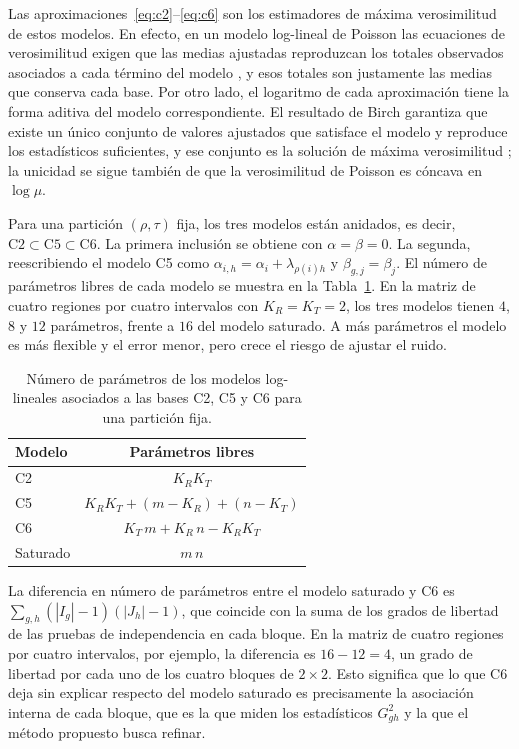 Las aproximaciones~\eqref{eq:c2}--\eqref{eq:c6} son los estimadores de máxima
verosimilitud de estos modelos. En efecto, en un modelo log-lineal de Poisson las
ecuaciones de verosimilitud exigen que las medias ajustadas reproduzcan los
totales observados asociados a cada término del modelo
\citep[Secs.~4.4.9 y~9.6.2]{Agresti2013}, y esos totales son justamente las medias
que conserva cada base. Por otro lado, el logaritmo de cada aproximación tiene la
forma aditiva del modelo correspondiente. El resultado de Birch garantiza que existe un
único conjunto de valores ajustados que satisface el modelo y reproduce los
estadísticos suficientes, y ese conjunto es la solución de máxima verosimilitud
\citep[Sec.~9.6.3]{Agresti2013}; la unicidad se sigue también de que la
verosimilitud de Poisson es cóncava en $\log \mu$.

Para una partición $(\rho, \tau)$ fija, los tres modelos están anidados, es decir,
$\mathrm{C2} \subset \mathrm{C5} \subset \mathrm{C6}$. La primera inclusión se
obtiene con $\alpha = \beta = 0$. La segunda, reescribiendo el modelo C5 como
$\alpha_{i,h} = \alpha_i + \lambda_{\rho(i) h}$ y $\beta_{g,j} = \beta_j$. El
número de parámetros libres de cada modelo se muestra en la
Tabla~\ref{tab:parametros}. En la matriz de cuatro regiones por cuatro intervalos
con $K_R = K_T = 2$, los tres modelos tienen $4$, $8$ y $12$ parámetros, frente a
$16$ del modelo saturado. A más parámetros el modelo es más flexible y el error
menor, pero crece el riesgo de ajustar el ruido.

\begin{table}[ht]
  \centering
  {\footnotesize
  \renewcommand{\arraystretch}{1.4}
  \begin{tabular}{@{}lc@{}}
    \toprule
    \textbf{Modelo} & \textbf{Parámetros libres} \\
    \midrule
    C2 & $K_R K_T$ \\
    C5 & $K_R K_T + (m - K_R) + (n - K_T)$ \\
    C6 & $K_T\, m + K_R\, n - K_R K_T$ \\
    Saturado & $m\,n$ \\
    \bottomrule
  \end{tabular}
  }
  \caption{Número de parámetros de los modelos log-lineales asociados a las bases
  C2, C5 y C6 para una partición fija.}
  \label{tab:parametros}
\end{table}

La diferencia en número de parámetros entre el modelo saturado y C6 es
$\sum_{g,h} (|I_g| - 1)(|J_h| - 1)$, que coincide con la suma de los grados de
libertad de las pruebas de independencia en cada bloque. En la matriz de cuatro
regiones por cuatro intervalos, por ejemplo, la diferencia es $16 - 12 = 4$, un
grado de libertad por cada uno de los cuatro bloques de $2 \times 2$. Esto significa que lo
que C6 deja sin explicar respecto del modelo saturado es precisamente la
asociación interna de cada bloque, que es la que miden los estadísticos
$G^2_{gh}$ y la que el método propuesto busca refinar.

